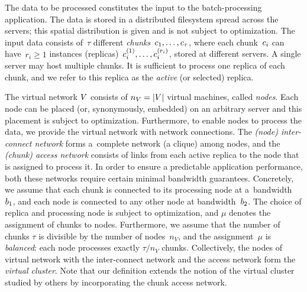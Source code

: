  The data to be processed constitutes the input to the batch-processing application.
The data is stored in a distributed filesystem spread across the servers; this spatial distribution is given and is not subject to optimization.
The input data consists of~$\tau$ different \emph{chunks}~$c_1, \ldots, c_{\tau}$,
where each chunk~$c_i$ can have~$r_i\geq 1$ instances (replicas)~$c_{i}^{(1)},\ldots, c_{i}^{(r_i)}$,
 stored at different servers. A single server may host multiple chunks.
It is sufficient to process one replica of each chunk, and we refer to this
replica as the \emph{active} (or selected) replica.

 The virtual network $V$ consists of $n_V=|V|$ virtual machines, called \emph{nodes}.
Each node can be placed (or, synonymously, embedded) on an arbitrary server and this placement is subject
to optimization.
Furthermore, to enable nodes to process the data, we provide the virtual network with network connections.
The \emph{(node) inter-connect network} forms a~complete network (a clique) among nodes,
and the \emph{(chunk) access network} consists of links from each active replica to the node that is assigned to process it.
In order to ensure a predictable application performance, both these networks require certain minimal bandwidth guarantees.
Concretely, we assume that each chunk
is connected to its processing node at a~bandwidth~$b_1$, and each node is connected to any other node
at  bandwidth~$b_2$.
The choice of replica and processing node is subject to optimization, and
$\mu$ denotes the assignment of chunks to nodes.
Furthermore, we assume that the number of chunks $\tau$ is divisible by the number of nodes~$n_V$, and the assignment~$\mu$ is \emph{balanced}:
each node processes exactly $\tau / n_V$ chunks.
Collectively, the nodes of virtual network with the inter-connect network and the access network form the \emph{virtual cluster}.
Note that our definition extends the notion of the virtual cluster studied by others \cite{oktopus,talk-about,infocom16,ccr15emb,proteus} by incorporating the chunk access network.


